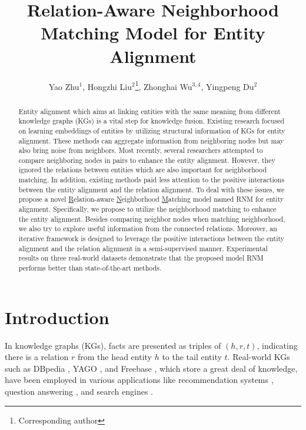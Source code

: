 \documentclass[letterpaper]{article} %
\title{Relation-Aware Neighborhood Matching Model for Entity Alignment}
\author {
    Yao Zhu$^1$, 
    Hongzhi Liu$^2$\thanks{Corresponding author},
    Zhonghai Wu$^{3,4}$,
    Yingpeng Du$^2$\\
}
\begin{document}
\maketitle

\begin{abstract}
Entity alignment which aims at linking entities with the same
meaning from different knowledge graphs (KGs) is a vital step for
knowledge fusion. Existing research focused on learning embeddings
of entities by utilizing structural information of KGs for entity
alignment. These methods can aggregate information from 
neighboring nodes but may also bring noise from neighbors.
Most recently, several researchers attempted to compare neighboring
nodes in pairs to enhance the entity alignment. However, they
ignored the relations between entities which are also important for
neighborhood matching. In addition, existing methods paid less
attention to the positive interactions between the entity alignment
and the relation alignment. To deal with these issues, we propose a
novel \underline{R}elation-aware \underline{N}eighborhood
\underline{M}atching model named RNM for entity alignment.
Specifically, we propose to utilize the neighborhood matching to
enhance the entity alignment. Besides comparing neighbor nodes when
matching neighborhood, we also try to explore useful information from the
connected relations. Moreover, an iterative framework is designed to
leverage the positive interactions between the entity alignment and
the relation alignment in a semi-supervised manner. Experimental
results on three real-world datasets demonstrate that the proposed
model RNM performs better than state-of-the-art methods.
\end{abstract}



\section{Introduction}

In knowledge graphs (KGs), facts are presented as triples of
$(h,r,t)$, indicating there is a relation $r$ from the head entity
$h$ to the tail entity $t$. Real-world KGs such as DBpedia
\cite{lehmann2015dbpedia}, YAGO \cite{suchanek2007yago}, and
Freebase \cite{bollacker2008freebase}, which store a great deal of
knowledge, have been employed in various applications like
recommendation systems \cite{cao2019unifying}, question answering
\cite{huang2019knowledge}, and search engines
\cite{xiong2017explicit}.
\end{document}
